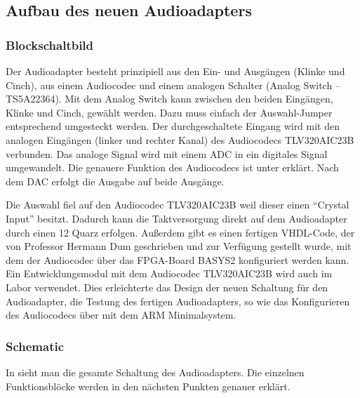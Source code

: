 
\subsection{Aufbau des neuen Audioadapters}
\subsubsection{Blockschaltbild}
Der Audioadapter besteht prinzipiell aus den Ein- und Ausgängen (Klinke und Cinch), aus einem Audiocodec und einem analogen Schalter (Analog Switch – TS5A22364). Mit dem Analog Switch kann zwischen den beiden Eingängen, Klinke und Cinch, gewählt werden. Dazu muss einfach der Auswahl-Jumper entsprechend umgesteckt werden. Der durchgeschaltete Eingang wird mit den analogen Eingängen (linker und rechter Kanal) des Audiocodecs TLV320AIC23B verbunden. Das analoge Signal wird mit einem \gls{ADC} in ein digitales Signal umgewandelt. Die genauere Funktion des Audiocodecs ist unter  erklärt. Nach dem \gls{DAC} erfolgt die Ausgabe auf beide Ausgänge.

Die Auswahl fiel auf den Audiocodec TLV320AIC23B weil dieser einen \enquote{Crystal Input} besitzt. Dadurch kann die Taktversorgung direkt auf dem Audioadapter durch einen \unit{12}{\mega\hertz} Quarz erfolgen. Außerdem gibt es einen fertigen VHDL-Code, der von Professor Hermann Dum geschrieben und zur Verfügung gestellt wurde, mit dem der Audiocodec über das FPGA-Board BASYS2 konfiguriert werden kann. Ein Entwicklungsmodul mit dem Audiocodec TLV320AIC23B wird auch im Labor verwendet. Dies erleichterte das Design der neuen Schaltung für den Audioadapter, die Testung des fertigen Audioadapters, so wie das Konfigurieren des Audiocodecs über \IIC{} mit dem \gls{ARM} \gls{Minimalsystem}.


\subsubsection{Schematic}
In  sieht man die gesamte Schaltung des Audioadapters. Die einzelnen Funktionsblöcke werden in den nächsten Punkten genauer erklärt.


